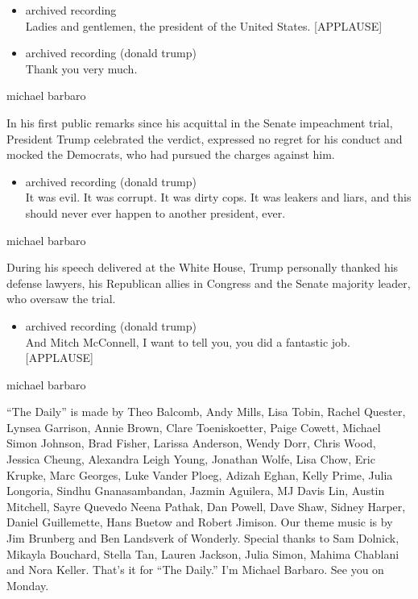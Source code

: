 \begin{itemize}
\item
  archived recording\\
  Ladies and gentlemen, the president of the United States.
  {[}APPLAUSE{]}
\item
  archived recording (donald trump)\\
  Thank you very much.
\end{itemize}

michael barbaro

In his first public remarks since his acquittal in the Senate
impeachment trial, President Trump celebrated the verdict, expressed no
regret for his conduct and mocked the Democrats, who had pursued the
charges against him.

\begin{itemize}
\tightlist
\item
  archived recording (donald trump)\\
  It was evil. It was corrupt. It was dirty cops. It was leakers and
  liars, and this should never ever happen to another president, ever.
\end{itemize}

michael barbaro

During his speech delivered at the White House, Trump personally thanked
his defense lawyers, his Republican allies in Congress and the Senate
majority leader, who oversaw the trial.

\begin{itemize}
\tightlist
\item
  archived recording (donald trump)\\
  And Mitch McConnell, I want to tell you, you did a fantastic job.
  {[}APPLAUSE{]}
\end{itemize}

michael barbaro

``The Daily'' is made by Theo Balcomb, Andy Mills, Lisa Tobin, Rachel
Quester, Lynsea Garrison, Annie Brown, Clare Toeniskoetter, Paige
Cowett, Michael Simon Johnson, Brad Fisher, Larissa Anderson, Wendy
Dorr, Chris Wood, Jessica Cheung, Alexandra Leigh Young, Jonathan Wolfe,
Lisa Chow, Eric Krupke, Marc Georges, Luke Vander Ploeg, Adizah Eghan,
Kelly Prime, Julia Longoria, Sindhu Gnanasambandan, Jazmin Aguilera, MJ
Davis Lin, Austin Mitchell, Sayre Quevedo Neena Pathak, Dan Powell, Dave
Shaw, Sidney Harper, Daniel Guillemette, Hans Buetow and Robert Jimison.
Our theme music is by Jim Brunberg and Ben Landsverk of Wonderly.
Special thanks to Sam Dolnick, Mikayla Bouchard, Stella Tan, Lauren
Jackson, Julia Simon, Mahima Chablani and Nora Keller. That's it for
``The Daily.'' I'm Michael Barbaro. See you on Monday.

